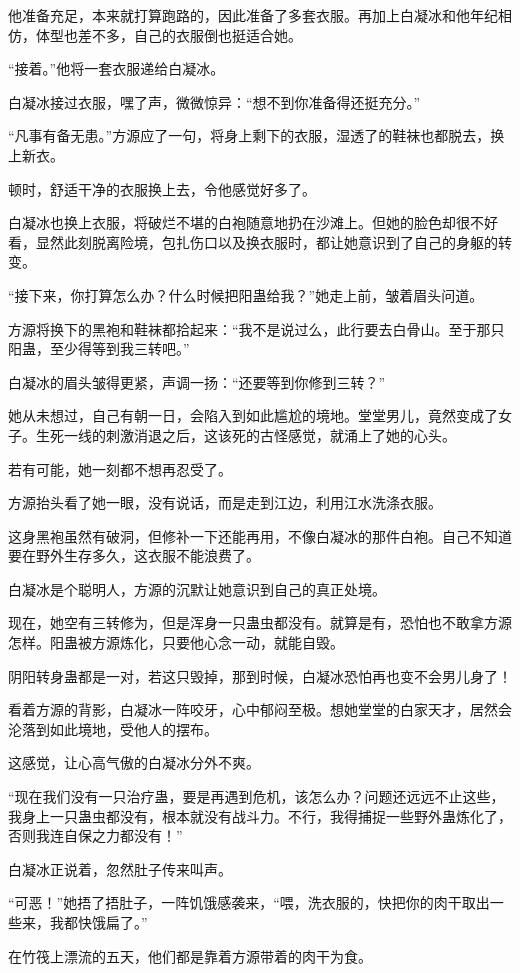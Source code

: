 \begin{this_body}
他准备充足，本来就打算跑路的，因此准备了多套衣服。再加上白凝冰和他年纪相仿，体型也差不多，自己的衣服倒也挺适合她。

“接着。”他将一套衣服递给白凝冰。

白凝冰接过衣服，嘿了声，微微惊异：“想不到你准备得还挺充分。”

“凡事有备无患。”方源应了一句，将身上剩下的衣服，湿透了的鞋袜也都脱去，换上新衣。

顿时，舒适干净的衣服换上去，令他感觉好多了。

白凝冰也换上衣服，将破烂不堪的白袍随意地扔在沙滩上。但她的脸色却很不好看，显然此刻脱离险境，包扎伤口以及换衣服时，都让她意识到了自己的身躯的转变。

“接下来，你打算怎么办？什么时候把阳蛊给我？”她走上前，皱着眉头问道。

方源将换下的黑袍和鞋袜都拾起来：“我不是说过么，此行要去白骨山。至于那只阳蛊，至少得等到我三转吧。”

白凝冰的眉头皱得更紧，声调一扬：“还要等到你修到三转？”

她从未想过，自己有朝一日，会陷入到如此尴尬的境地。堂堂男儿，竟然变成了女子。生死一线的刺激消退之后，这该死的古怪感觉，就涌上了她的心头。

若有可能，她一刻都不想再忍受了。

方源抬头看了她一眼，没有说话，而是走到江边，利用江水洗涤衣服。

这身黑袍虽然有破洞，但修补一下还能再用，不像白凝冰的那件白袍。自己不知道要在野外生存多久，这衣服不能浪费了。

白凝冰是个聪明人，方源的沉默让她意识到自己的真正处境。

现在，她空有三转修为，但是浑身一只蛊虫都没有。就算是有，恐怕也不敢拿方源怎样。阳蛊被方源炼化，只要他心念一动，就能自毁。

阴阳转身蛊都是一对，若这只毁掉，那到时候，白凝冰恐怕再也变不会男儿身了！

看着方源的背影，白凝冰一阵咬牙，心中郁闷至极。想她堂堂的白家天才，居然会沦落到如此境地，受他人的摆布。

这感觉，让心高气傲的白凝冰分外不爽。

“现在我们没有一只治疗蛊，要是再遇到危机，该怎么办？问题还远远不止这些，我身上一只蛊虫都没有，根本就没有战斗力。不行，我得捕捉一些野外蛊炼化了，否则我连自保之力都没有！”

白凝冰正说着，忽然肚子传来叫声。

“可恶！”她捂了捂肚子，一阵饥饿感袭来，“喂，洗衣服的，快把你的肉干取出一些来，我都快饿扁了。”

在竹筏上漂流的五天，他们都是靠着方源带着的肉干为食。


\end{this_body}
